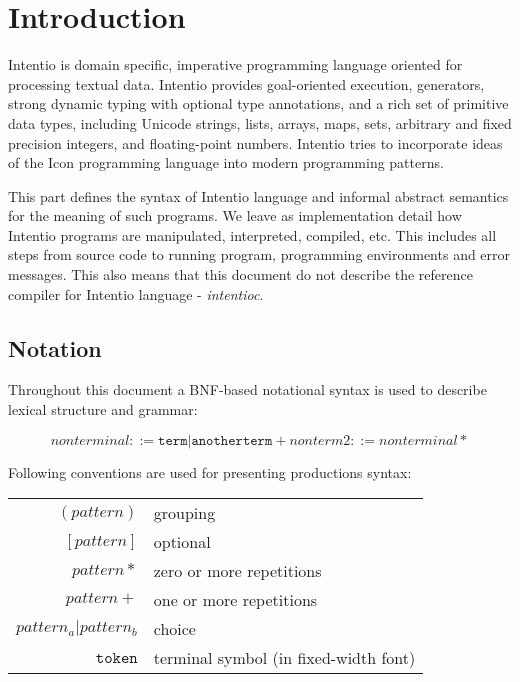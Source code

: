 \chapter{Introduction}

Intentio is domain specific, imperative programming language oriented for processing textual data. Intentio provides goal-oriented execution, generators, strong dynamic typing with optional type annotations, and a rich set of primitive data types, including Unicode strings, lists, arrays, maps, sets, arbitrary and fixed precision integers, and floating-point numbers. Intentio tries to incorporate ideas of the Icon\cite{TheIconProgrammingLanguage} programming language into modern programming patterns.

This part defines the syntax of Intentio language and informal abstract semantics for the meaning of such programs. We leave as implementation detail how Intentio programs are manipulated, interpreted, compiled, etc. This includes all steps from source code to running program, programming environments and error messages. This also means that this document do not describe the reference compiler for Intentio language - \emph{intentioc}\cite{intentioc}.

\section{Notation}

Throughout this document a BNF-based notational syntax is used to describe lexical structure and grammar:

\[
nonterminal ::= \texttt{term} | \texttt{another} \texttt{term}+
nonterm2    ::= nonterminal*
\]

Following conventions are used for presenting productions syntax:

\begin{center}
  \begin{tabular}[t]{rl}
    \((pattern)\)                & grouping \\
    \([pattern]\)                & optional \\
    \(pattern*\)                 & zero or more repetitions \\
    \(pattern+\)                 & one or more repetitions \\
    \(pattern_a | pattern_b\)    & choice \\
    \(\texttt{token}\)           & terminal symbol (in fixed-width font)
  \end{tabular}
\end{center}

